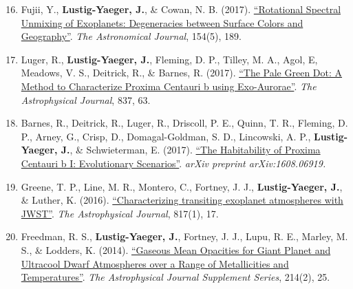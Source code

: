 \documentclass[margin,10pt]{res}
\newenvironment{benumerate}[1]{
    \let\oldItem\item
    \def\item{\addtocounter{enumi}{-2}\oldItem}
    \begin{enumerate}
    \setcounter{enumi}{#1}
    \addtocounter{enumi}{1}
}{
    \end{enumerate}
}
\begin{document}
\begin{resume}
\begin{benumerate}{15}
                    \item Fujii, Y., \textbf{Lustig-Yaeger, J.}, \& Cowan, N. B. (2017). \href{http://adsabs.harvard.edu/abs/2017arXiv170804886F}{``Rotational Spectral Unmixing of Exoplanets: Degeneracies between Surface Colors and Geography''}. \textit{The Astronomical Journal}, 154(5), 189.
                    \item Luger, R., \textbf{Lustig-Yaeger, J.}, Fleming, D. P., Tilley, M. A., Agol, E, Meadows, V. S., Deitrick, R., \& Barnes, R. (2017). \href{http://adsabs.harvard.edu/abs/2017ApJ...837...63L}{``The Pale Green Dot: A Method to Characterize Proxima Centauri b using Exo-Aurorae''}. \textit{The Astrophysical Journal}, 837, 63.
                    \item Barnes, R., Deitrick, R., Luger, R., Driscoll, P. E., Quinn, T. R., Fleming, D. P., Arney, G., Crisp, D., Domagal-Goldman, S. D., Lincowski, A. P., \textbf{Lustig-Yaeger, J.}, \& Schwieterman, E. (2017). \href{http://adsabs.harvard.edu/cgi-bin/bib_query?arXiv:1608.06919}{``The Habitability of Proxima Centauri b I: Evolutionary Scenarios''}. \textit{arXiv preprint arXiv:1608.06919.}
                    \item Greene, T. P., Line, M. R., Montero, C., Fortney, J. J., \textbf{Lustig-Yaeger, J.}, \& Luther, K. (2016). \href{http://adsabs.harvard.edu/abs/2016ApJ...817...17G}{``Characterizing transiting exoplanet atmospheres with JWST''}. \textit{The Astrophysical Journal}, 817(1), 17.
                    \item Freedman, R. S., \textbf{Lustig-Yaeger, J.}, Fortney, J. J., Lupu, R. E., Marley, M. S., \& Lodders, K. (2014). \href{http://adsabs.harvard.edu/abs/2014ApJS..214...25F}{``Gaseous Mean Opacities for Giant Planet and Ultracool Dwarf Atmospheres over a Range of Metallicities and Temperatures''}. \textit{The Astrophysical Journal Supplement Series}, 214(2), 25.\\
                \end{benumerate}
                 

\end{resume}
\end{document}
